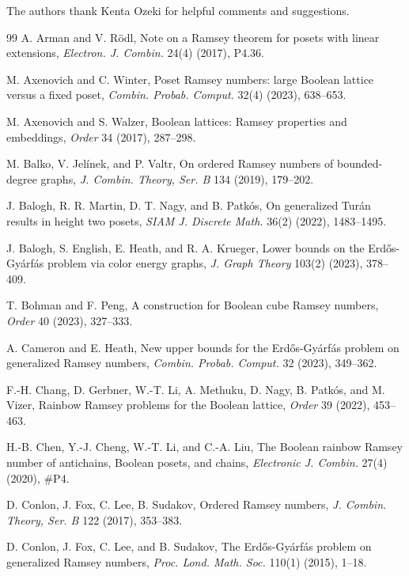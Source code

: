 \documentclass[twoside,12pt]{article}
\begin{document}
The authors thank Kenta Ozeki for helpful comments and suggestions. 
\begin{thebibliography}{99}
A. Arman and V. R\"odl,
Note on a Ramsey theorem for posets with linear extensions,
\emph{Electron. J. Combin.} 24(4) (2017),  P4.36.

M. Axenovich and C. Winter, Poset Ramsey numbers: large Boolean lattice versus a fixed poset, \emph{Combin. Probab. Comput.} 32(4) (2023), 638--653.

M. Axenovich and S. Walzer, Boolean lattices: Ramsey properties and embeddings, \emph{Order} 34 (2017), 287--298.

M. Balko, V. Jel\'{i}nek, and P. Valtr, On ordered Ramsey numbers of bounded-degree graphs, \emph{J. Combin. Theory, Ser. B} 134 (2019), 179--202.

J. Balogh, R. R. Martin, D. T. Nagy, and B. Patk\'{o}s, On generalized Tur\'{a}n results in height two posets, \emph{SIAM J. Discrete Math.} 36(2) (2022), 1483--1495.

J. Balogh, S. English, E. Heath, and R. A. Krueger, Lower bounds on the Erd\H{o}s-Gy\'{a}rf\'{a}s problem via color energy graphs, \emph{J. Graph Theory} 103(2) (2023), 378--409.

T. Bohman and F. Peng, A construction for Boolean cube Ramsey numbers, \emph{Order} 40 (2023), 327--333.

A. Cameron and E. Heath, New upper bounds for the Erd\H{o}s-Gy\'{a}rf\'{a}s problem on generalized Ramsey numbers, \emph{Combin. Probab. Comput.} 32 (2023), 349--362.

F.-H. Chang, D. Gerbner, W.-T. Li, A. Methuku, D. Nagy, B. Patk\'{o}s, and M. Vizer, Rainbow Ramsey problems for the Boolean lattice, \emph{Order} 39 (2022), 453--463.

H.-B. Chen, Y.-J. Cheng, W.-T. Li, and C.-A. Liu, The Boolean rainbow Ramsey number of antichains, Boolean posets, and chains, \emph{Electronic J. Combin.} 27(4) (2020), \#P4.

D. Conlon, J. Fox, C. Lee, B. Sudakov, Ordered Ramsey numbers, \emph{J. Combin. Theory, Ser. B} 122 (2017), 353--383.

D. Conlon, J. Fox, C. Lee, and B. Sudakov, The Erd\H{o}s-Gy\'{a}rf\'{a}s problem on generalized Ramsey numbers, \emph{Proc. Lond. Math. Soc.} 110(1) (2015), 1--18.


\end{thebibliography}
\end{document}
